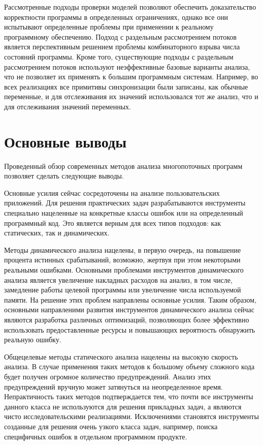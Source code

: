 Рассмотренные подходы проверки моделей позволяют обеспечить доказательство корректности программы в определенных ограничениях, однако все они испытывают определенные проблемы при применении к реальному программному обеспечению.
Подход с раздельным рассмотрением потоков является перспективным решением проблемы комбинаторного взрыва числа состояний программы.
Кроме того, существующие подходы с раздельным рассмотрением потоков используют неэффективные базовые варианты анализа, что не позволяет их применять к большим программным системам.
Например, во всех реализациях все примитивы синхронизации были записаны, как обычные переменные, и для отслеживания их значений использовался тот же анализ, что и для отслеживания значений переменных.


\section{Основные выводы}
\label{rw:conclusion}
Проведенный обзор современных методов анализа многопоточных программ позволяет сделать следующие выводы.

Основные усилия сейчас сосредоточены на анализе пользовательских приложений.
Для решения практических задач разрабатываются инструменты специально нацеленные на конкретные классы ошибок или на определенный программный код.
Это является верным для всех типов подходов: как статических, так и динамических.

Методы динамического анализа нацелены, в первую очередь, на повышение процента истинных срабатываний, возможно, жертвуя при этом некоторыми реальными ошибками.
Основными проблемами инструментов динамического анализа является увеличение накладных расходов на анализ, в том числе, замедление работы целевой программы или увеличение числа используемой памяти.
На решение этих проблем направлены основные усилия.
Таким образом, основными направленими развития инструментов динамического анализа сейчас являются разработка различных оптимизаций, позволяющих более эффективно использовать предоставленные ресурсы и повышающих вероятность обнаружить реальную ошибку.

Общецелевые методы статического анализа нацелены на высокую скорость анализа.
В случае применения таких методов к большому объему сложного кода будет получен огромное количество предупреждений.
Анализ этих предупреждений вручную может затянуться на неопределенное время.
Непрактичность таких методов подтверждается тем, что почти все инструменты данного класса не используются для решения прикладных задач, а являются чисто исследовательскими реализациями. 
Исключениями становятся инструменты созданные для решения очень узкого класса задач, например, поиска специфичных ошибок в отдельном программном продукте.

